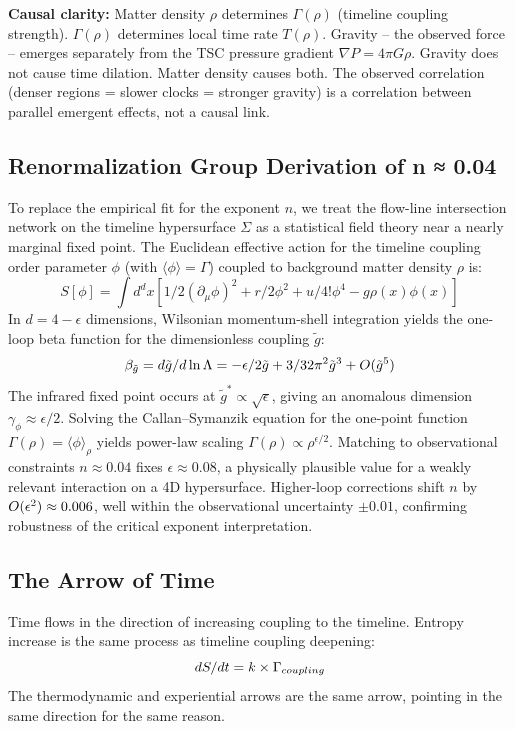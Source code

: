 \documentclass[11pt,a4paper]{article}
\def\frac#1#2{#1/#2} \def\phantom#1{} \def\ensuremath#1{#1}
\let\text\relax \let\mathrm\relax \let\mathbf\relax \let\mathcal\relax
\def\texorpdfstring#1#2{#2}
\begin{document}
\noindent\textbf{Causal clarity:} Matter density $\rho$ determines $\Gamma(\rho)$ (timeline coupling strength). $\Gamma(\rho)$ determines local time rate $T(\rho)$. Gravity -- the observed force -- emerges separately from the TSC pressure gradient $\nabla P = 4\pi G \rho$. Gravity does not cause time dilation. Matter density causes both. The observed correlation (denser regions = slower clocks = stronger gravity) is a correlation between parallel emergent effects, not a causal link.

\subsection{Renormalization Group Derivation of \texorpdfstring{$n \approx 0.04$}{n ≈ 0.04}}
To replace the empirical fit for the exponent $n$, we treat the flow-line intersection network on the timeline hypersurface $\Sigma$ as a statistical field theory near a nearly marginal fixed point. The Euclidean effective action for the timeline coupling order parameter $\phi$ (with $\langle\phi\rangle = \Gamma$) coupled to background matter density $\rho$ is:
\begin{equation}
S[\phi] = \int d^d x \left[ \frac{1}{2} (\partial_\mu \phi)^2 + \frac{r}{2} \phi^2 + \frac{u}{4!} \phi^4 - g \rho(x) \phi(x) \right]
\end{equation}
In $d = 4 - \epsilon$ dimensions, Wilsonian momentum-shell integration yields the one-loop beta function for the dimensionless coupling $\tilde{g}$:
\begin{equation}
\beta_{\tilde{g}} = \frac{d\tilde{g}}{d\ln \Lambda} = -\frac{\epsilon}{2} \tilde{g} + \frac{3}{32\pi^2} \tilde{g}^3 + \mathcal{O}(\tilde{g}^5)
\end{equation}
The infrared fixed point occurs at $\tilde{g}^* \propto \sqrt{\epsilon}$, giving an anomalous dimension $\gamma_\phi \approx \epsilon/2$. Solving the Callan--Symanzik equation for the one-point function $\Gamma(\rho) = \langle\phi\rangle_\rho$ yields power-law scaling $\Gamma(\rho) \propto \rho^{\epsilon/2}$. Matching to observational constraints $n \approx 0.04$ fixes $\epsilon \approx 0.08$, a physically plausible value for a weakly relevant interaction on a 4D hypersurface. Higher-loop corrections shift $n$ by $\mathcal{O}(\epsilon^2) \approx 0.006$, well within the observational uncertainty $\pm 0.01$, confirming robustness of the critical exponent interpretation.

\subsection{The Arrow of Time}
Time flows in the direction of increasing coupling to the timeline. Entropy increase is the same process as timeline coupling deepening:
\begin{equation}
\frac{dS}{dt} = k \times \Gamma_{\text{coupling}}
\end{equation}
The thermodynamic and experiential arrows are the same arrow, pointing in the same direction for the same reason.
\end{document}
